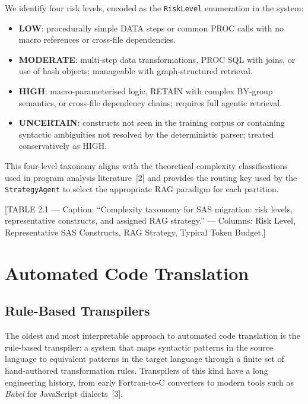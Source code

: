 We identify four risk levels, encoded as the \texttt{RiskLevel} enumeration
in the system:

\begin{itemize}
  \item \textbf{LOW}: procedurally simple DATA steps or common PROC calls with
    no macro references or cross-file dependencies.
  \item \textbf{MODERATE}: multi-step data transformations, PROC SQL with joins,
    or use of hash objects; manageable with graph-structured retrieval.
  \item \textbf{HIGH}: macro-parameterised logic, RETAIN with complex BY-group
    semantics, or cross-file dependency chains; requires full agentic retrieval.
  \item \textbf{UNCERTAIN}: constructs not seen in the training corpus or
    containing syntactic ambiguities not resolved by the deterministic parser;
    treated conservatively as HIGH.
\end{itemize}

This four-level taxonomy aligns with the theoretical complexity classifications
used in program analysis literature~[2] and provides the routing key used by
the \texttt{StrategyAgent} to select the appropriate \ac{RAG} paradigm for
each partition.

[TABLE 2.1 --- Caption: ``Complexity taxonomy for SAS migration: risk levels,
representative constructs, and assigned RAG strategy.'' --- Columns: Risk
Level, Representative SAS Constructs, RAG Strategy, Typical Token Budget.]

\section{Automated Code Translation}
\label{sec:code-translation}

\subsection{Rule-Based Transpilers}
\label{subsec:rule-based}

The oldest and most interpretable approach to automated code translation is the
rule-based transpiler: a system that maps syntactic patterns in the source
language to equivalent patterns in the target language through a finite set of
hand-authored transformation rules. Transpilers of this kind have a long
engineering history, from early Fortran-to-C converters to modern tools such as
\textit{Babel} for JavaScript dialects~[3].

